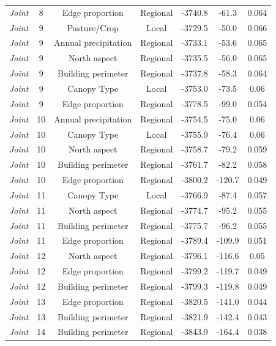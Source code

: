 \documentclass[preprint,final,times,12pt,3p]{elsarticle}
\begin{document}
\begin{longtable}{ c c c c c c c}
	\emph{Joint} & 8 & Edge proportion & Regional & -3740.8 & -61.3 & 0.064 \\
	\emph{Joint} & 9 & Pasture/Crop & Local & -3729.5 & -50.0 & 0.066 \\
	\emph{Joint} & 9 & Annual precipitation & Regional & -3733.1 & -53.6 & 0.065 \\
	\emph{Joint} & 9 & North aspect & Regional & -3735.5 & -56.0 & 0.065 \\
	\emph{Joint} & 9 & Building perimeter & Regional & -3737.8 & -58.3 & 0.064 \\
	\emph{Joint} & 9 & Canopy Type & Local & -3753.0 & -73.5 & 0.06 \\
	\emph{Joint} & 9 & Edge proportion & Regional & -3778.5 & -99.0 & 0.054 \\
	\emph{Joint} & 10 & Annual precipitation & Regional & -3754.5 & -75.0 & 0.06 \\
	\emph{Joint} & 10 & Canopy Type & Local & -3755.9 & -76.4 & 0.06 \\
	\emph{Joint} & 10 & North aspect & Regional & -3758.7 & -79.2 & 0.059 \\
	\emph{Joint} & 10 & Building perimeter & Regional & -3761.7 & -82.2 & 0.058 \\
	\emph{Joint} & 10 & Edge proportion & Regional & -3800.2 & -120.7 & 0.049 \\
	\emph{Joint} & 11 & Canopy Type & Local & -3766.9 & -87.4 & 0.057 \\
	\emph{Joint} & 11 & North aspect & Regional & -3774.7 & -95.2 & 0.055 \\
	\emph{Joint} & 11 & Building perimeter & Regional & -3775.7 & -96.2 & 0.055 \\
	\emph{Joint} & 11 & Edge proportion & Regional & -3789.4 & -109.9 & 0.051 \\
	\emph{Joint} & 12 & North aspect & Regional & -3796.1 & -116.6 & 0.05 \\
	\emph{Joint} & 12 & Edge proportion & Regional & -3799.2 & -119.7 & 0.049 \\
	\emph{Joint} & 12 & Building perimeter & Regional & -3799.3 & -119.8 & 0.049 \\
	\emph{Joint} & 13 & Edge proportion & Regional & -3820.5 & -141.0 & 0.044 \\
	\emph{Joint} & 13 & Building perimeter & Regional & -3821.9 & -142.4 & 0.043 \\
	\emph{Joint} & 14 & Building perimeter & Regional & -3843.9 & -164.4 & 0.038 \\
\end{longtable}
\endgroup
\end{document}
